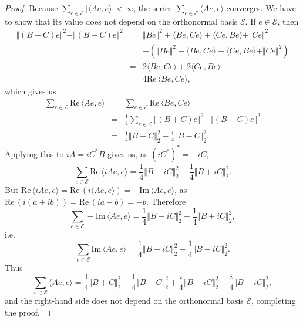 \documentclass{article}
\newcommand{\inner}[2]{\langle #1, #2 \rangle}
\def\Re{\ensuremath{\mathrm{Re}}\,}
\def\Im{\ensuremath{\mathrm{Im}}\,}
\newcommand{\norm}[1]{\Vert #1 \Vert}
\begin{document}
\begin{proof}
Because $\sum_{e \in \mathscr{E}} |\inner{Ae}{e}|<\infty$, the series
$\sum_{e \in \mathscr{E}} \inner{Ae}{e}$ converges. We have to show that its value does not depend on the orthonormal basis $\mathscr{E}$.
If $e \in \mathscr{E}$, then
\begin{eqnarray*}
\norm{(B+C)e}^2 - \norm{(B-C)e}^2&=&\norm{Be}^2 + \inner{Be}{Ce}+\inner{Ce}{Be}+\norm{Ce}^2\\
&&-\left( \norm{Be}^2 - \inner{Be}{Ce}-\inner{Ce}{Be}+\norm{Ce}^2 \right)\\
&=&2\inner{Be}{Ce} + 2\inner{Ce}{Be}\\
&=&4\Re \inner{Be}{Ce},
\end{eqnarray*}
which gives us
\begin{eqnarray*}
\sum_{e \in \mathscr{E}} \Re \inner{Ae}{e}  &=& \sum_{e \in \mathscr{E}}\Re \inner{Be}{Ce}\\
&=&\frac{1}{4} \sum_{e \in \mathscr{E}} \norm{(B+C)e}^2 - \norm{(B-C)e}^2\\
&=&\frac{1}{4} \norm{B+C}_2^2 - \frac{1}{4} \norm{B-C}_2^2.
\end{eqnarray*}
Applying this to $iA=iC^*B$ gives us, as $(iC^*)^*=-iC$,
\[
\sum_{e \in \mathscr{E}} \Re \inner{iAe}{e} = \frac{1}{4} \norm{B-iC}_2^2 - \frac{1}{4} \norm{B+iC}_2^2.
\]
But $\Re \inner{iAe}{e} = \Re (i \inner{Ae}{e}) = - \Im \inner{Ae}{e}$, as $\Re (i(a+ib))=\Re (ia-b)=-b$. Therefore
\[
\sum_{e \in \mathscr{E}} -\Im \inner{Ae}{e}= \frac{1}{4} \norm{B-iC}_2^2 - \frac{1}{4} \norm{B+iC}_2^2,
\]
i.e.
\[
\sum_{e \in \mathscr{E}} \Im \inner{Ae}{e} = \frac{1}{4} \norm{B+iC}_2^2 -  \frac{1}{4} \norm{B-iC}_2^2.
\]
Thus
\[
\sum_{e \in \mathscr{E}} \inner{Ae}{e} = \frac{1}{4} \norm{B+C}_2^2 - \frac{1}{4} \norm{B-C}_2^2 + \frac{i}{4} \norm{B+iC}_2^2
 -  \frac{i}{4} \norm{B-iC}_2^2,
\]
and the right-hand side does not depend on the orthonormal basis $\mathscr{E}$, completing the proof.
\end{proof}
\end{document}
